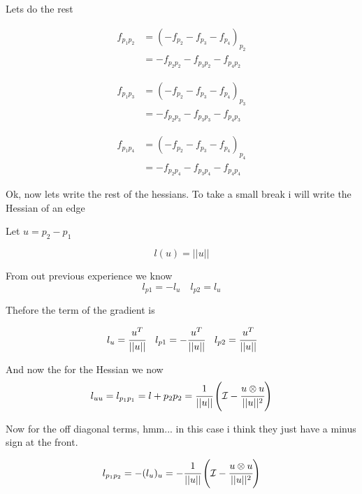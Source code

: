\documentclass[11pt]{article}
\theoremstyle{plain}
\theoremstyle{definition}
\begin{document}
Lets do the rest 
 
\begin{align}
    f_{p_1p_2} &= (-f_{p_2} -f_{p_3} -f_{p_4})_p_2\\
                &= -f_{p_2p_2} - f_{p_3p_2} - f_{p_4p_2} 
\end{align}


\begin{align}
    f_{p_1p_3} &= (-f_{p_2} -f_{p_3} -f_{p_4})_p_3\\
                &= -f_{p_2p_3} - f_{p_3p_3} - f_{p_4p_3}
\end{align}

\begin{align}
    f_{p_1p_4} &= (-f_{p_2} -f_{p_3} -f_{p_4})_p_4\\
                &= -f_{p_2p_4} - f_{p_3p_4} - f_{p_4p_4}
\end{align}

\newpage 
 

Ok, now lets write the rest of the hessians. To take a small break i will write the Hessian of an edge 


Let $u = p_2-p_1$


\begin{equation}
    l(u) = \vert| u \vert| 
\end{equation}

From out previous experience we know 
\begin{equation}
    l_{p1} = -l_u \quad l_{p2} = l_u
\end{equation}

Thefore the term of the gradient is 

\begin{equation}
    l_u  = \cfrac{u^T}{||u||} \quad l_{p1} = -\cfrac{u^T}{||u||} \quad l_{p2} = \cfrac{u^T}{||u||}
\end{equation}

And now the for the Hessian we now 
\begin{equation}
    l_{uu} = l_{p_1p_1 } = l+{p_2p_2} = \cfrac{1}{||u||} \left( \mathcal{I} - \cfrac{u\otimes u}{||u||^2} \right)
\end{equation}

Now for the off diagonal terms, hmm... in this case i think they just have a minus sign at the front.

\begin{equation}
    l_{p_1p_2} =  -(l_u)_u = -\cfrac{1}{||u||} \left( \mathcal{I} - \cfrac{u\otimes u}{||u||^2} \right)
\end{equation}
\end{document}

